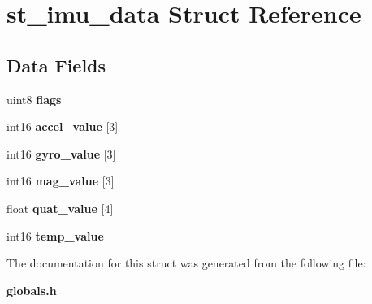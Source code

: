 \section{st\+\_\+imu\+\_\+data Struct Reference}
\label{structst__imu__data}
\subsection*{Data Fields}
\begin{DoxyCompactItemize}
\item 
\mbox{\label{structst__imu__data_acd8859336a5cb8a70051c97a438726a1}} 
uint8 {\bfseries flags}
\item 
\mbox{\label{structst__imu__data_a76e9575b13f4c390ccec733a5dac028f}} 
int16 {\bfseries accel\+\_\+value} [3]
\item 
\mbox{\label{structst__imu__data_a515e671f6e4fe912e9af6c73a8d654b9}} 
int16 {\bfseries gyro\+\_\+value} [3]
\item 
\mbox{\label{structst__imu__data_ae78e11a5f5ad413f738f6eb69ac60277}} 
int16 {\bfseries mag\+\_\+value} [3]
\item 
\mbox{\label{structst__imu__data_a2825af9e90a3b4d11e0f99f34a73d555}} 
float {\bfseries quat\+\_\+value} [4]
\item 
\mbox{\label{structst__imu__data_a093731ce8df43a5beb8df6e78368ec4c}} 
int16 {\bfseries temp\+\_\+value}
\end{DoxyCompactItemize}


The documentation for this struct was generated from the following file\+:\begin{DoxyCompactItemize}
\item 
\textbf{ globals.\+h}\end{DoxyCompactItemize}
